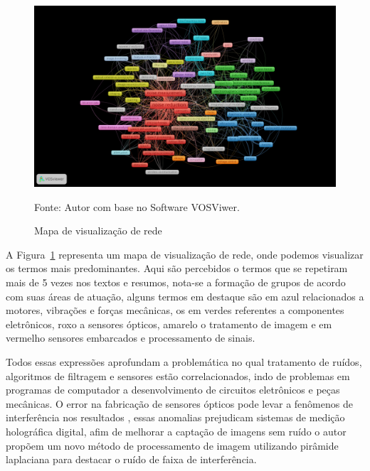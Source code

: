 \begin{figure}[H]
	\centering
	\includegraphics[width=15cm]{anexos/ris/IEEE/Noise_reduction_and_noise_abatement_andsensor_filtering_algorithm/network_visualization_with_lines.png}
	\caption{Mapa de visualização de rede}
	Fonte: Autor com base no Software VOSViwer.
	\label{fig: network_visualization_with_lines}
\end{figure}

A Figura~\ref{fig: network_visualization_with_lines} representa um mapa de visualização de rede, onde podemos visualizar os termos mais predominantes. Aqui são percebidos o termos que se repetiram mais de 5 vezes nos textos e resumos, nota-se a formação de grupos de acordo com suas áreas de atuação, alguns termos em destaque são em azul relacionados a motores, vibrações e forças mecânicas, os em verdes referentes a componentes eletrônicos, roxo a sensores ópticos, amarelo o tratamento de imagem e em vermelho sensores embarcados e processamento de sinais. 


Todos essas expressões aprofundam a problemática no qual tratamento de ruídos, algoritmos de filtragem e sensores estão correlacionados, indo de problemas em programas de computador a desenvolvimento de circuitos eletrônicos e peças mecânicas. O error na fabricação de sensores ópticos pode levar a fenômenos de interferência nos resultados \cite{liu_interference_stripe}, essas anomalias prejudicam sistemas de medição holográfica digital, afim de melhorar a captação de imagens sem ruído o autor propõem um novo método de processamento de imagem utilizando pirâmide laplaciana para destacar o ruído de faixa de interferência.


